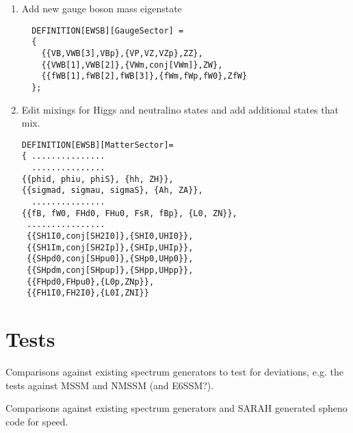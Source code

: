 \documentclass[final,3p,times,pdflatex]{elsarticle}
\begin{document}
\begin{enumerate}
\begin{enumerate}
\item Add new gauge boson  mass eigenstate
\begin{lstlisting} 
  DEFINITION[EWSB][GaugeSector] =
  { 
    {{VB,VWB[3],VBp},{VP,VZ,VZp},ZZ},
    {{VWB[1],VWB[2]},{VWm,conj[VWm]},ZW},
    {{fWB[1],fWB[2],fWB[3]},{fWm,fWp,fW0},ZfW}
  }; 
\end{lstlisting}
\item Edit mixings for Higgs and neutralino states and add additional states that mix.
\begin{lstlisting}
DEFINITION[EWSB][MatterSector]= 
{ ...............
  ...............
{{phid, phiu, phiS}, {hh, ZH}},
{{sigmad, sigmau, sigmaS}, {Ah, ZA}},
  ...............
{{fB, fW0, FHd0, FHu0, FsR, fBp}, {L0, ZN}},
 ................ 
 {{SH1I0,conj[SH2I0]},{SHI0,UHI0}},
 {{SH1Im,conj[SH2Ip]},{SHIp,UHIp}},
 {{SHpd0,conj[SHpu0]},{SHp0,UHp0}},
 {{SHpdm,conj[SHpup]},{SHpp,UHpp}},
 {{FHpd0,FHpu0},{L0p,ZNp}},
 {{FH1I0,FH2I0},{L0I,ZNI}}
\end{lstlisting}
\end{enumerate}  
 
\end{enumerate}   
\section{Tests}
Comparisons against existing spectrum generators to test for deviations, e.g. the tests against MSSM and NMSSM (and E6SSM?).

Comparisons against existing spectrum generators and SARAH generated spheno code for speed.
\end{document}

